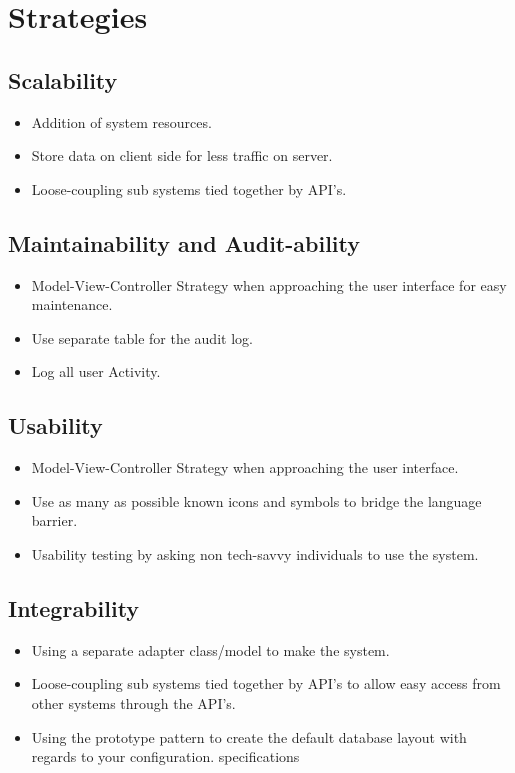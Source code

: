 
\section{Strategies}
	\subsection{Scalability}
		\begin{itemize}
			\item Addition of system resources.
			\item Store data on client side for less traffic on server.
			\item Loose-coupling sub systems tied together by API's.
		\end{itemize}
	\subsection{Maintainability and Audit-ability}
		\begin{itemize}
			\item Model-View-Controller Strategy when approaching the user interface for easy maintenance.
			\item Use separate table for the audit log.
			\item Log all user Activity.
		\end{itemize}
	\subsection{Usability}
		\begin{itemize}
			\item Model-View-Controller Strategy when approaching the user interface.
			\item Use as many as possible known icons and symbols to bridge the language barrier.
			\item Usability testing by asking non tech-savvy individuals to use the system.
		\end{itemize}
	\subsection{Integrability}
		\begin{itemize}
			\item Using a separate adapter class/model to make the system.
			\item Loose-coupling sub systems tied together by API's to allow easy access from other systems through the API's.
			\item Using the prototype pattern to create the default database layout with regards to your configuration. specifications
		\end{itemize}
